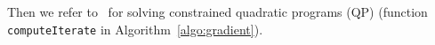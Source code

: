 \documentclass{tADR2e}
\newcommand\real{\mathbb{R}}
\newcommand\pii{\mathbf{p_{i,i+1}}}
\newcommand\CS{\mathcal{C}}
\newcommand\body{{\cal B}}
\newcommand\xx{\mathbf{x}} %
\newcommand\translation{\mathbf{t}}
\newcommand\tcolli{t_{coll\ i}}
\begin{document}



\vspace{0.2cm}




\vspace{0.2cm}

Then we refer to~\cite{nocedal2006numerical} for solving constrained quadratic 
programs (QP) (function \texttt{computeIterate} in 
Algorithm~\ref{algo:gradient}).

\end{document}
